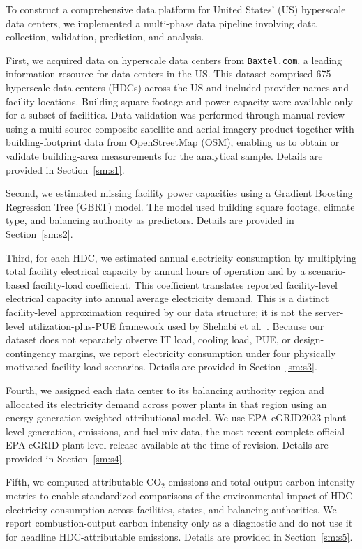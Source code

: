 \documentclass[12pt]{article}
\begin{document}
To construct a comprehensive data platform for United States' (US) hyperscale data centers, we implemented a multi-phase data pipeline involving data collection, validation, prediction, and analysis. 

First, we acquired data on hyperscale data centers from \texttt{Baxtel.com}, a leading information resource for data centers in the US. This dataset comprised 675 hyperscale data centers (HDCs) across the US and included provider names and facility locations. Building square footage and power capacity were available only for a subset of facilities. Data validation was performed through manual review using a multi-source composite satellite and aerial imagery product together with building-footprint data from OpenStreetMap (OSM), enabling us to obtain or validate building-area measurements for the analytical sample. Details are provided in Section~\ref{sm:s1}.

Second, we estimated missing facility power capacities using a Gradient Boosting Regression Tree (GBRT) model. The model used building square footage, climate type, and balancing authority as predictors. Details are provided in Section~\ref{sm:s2}.

Third, for each HDC, we estimated annual electricity consumption by multiplying total facility electrical capacity by annual hours of operation and by a scenario-based facility-load coefficient. This coefficient translates reported facility-level electrical capacity into annual average electricity demand. This is a distinct facility-level approximation required by our data structure; it is not the server-level utilization-plus-PUE framework used by Shehabi et al.~\cite{Shehabi2016DataCenter,Shehabi2024DataCenter}. Because our dataset does not separately observe IT load, cooling load, PUE, or design-contingency margins, we report electricity consumption under four physically motivated facility-load scenarios. Details are provided in Section~\ref{sm:s3}.

Fourth, we assigned each data center to its balancing authority region and allocated its electricity demand across power plants in that region using an energy-generation-weighted attributional model. We use EPA eGRID2023 plant-level generation, emissions, and fuel-mix data, the most recent complete official EPA eGRID plant-level release available at the time of revision. Details are provided in Section~\ref{sm:s4}.

Fifth, we computed attributable CO$_2$ emissions and total-output carbon intensity metrics to enable standardized comparisons of the environmental impact of HDC electricity consumption across facilities, states, and balancing authorities. We report combustion-output carbon intensity only as a diagnostic and do not use it for headline HDC-attributable emissions. Details are provided in Section~\ref{sm:s5}.
\end{document}
